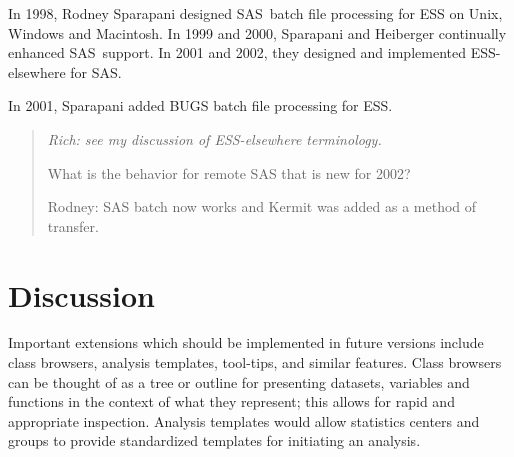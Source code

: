 \documentclass{article}
\newcommand*{\SAS}{\textsc{SAS}}
\newenvironment{Comment}{\begin{quote}\small\itshape }{\end{quote}}
\begin{document}
In 1998, Rodney Sparapani designed \SAS\ batch file processing for ESS
on Unix, Windows and Macintosh.  In 1999 and 2000, Sparapani and Heiberger
continually enhanced \SAS\ support. 
In 2001 and 2002, they designed and implemented ESS-elsewhere for \SAS.  

In 2001, Sparapani added BUGS batch file processing for ESS.

\begin{Comment}
Rich: see my discussion of ESS-elsewhere terminology.

What is the behavior for remote SAS that is new for 2002?

Rodney: SAS batch now works and Kermit was added as a method of transfer.
\end{Comment}


\section{Discussion}
\label{sec:discussion}


Important extensions which should be implemented in future
versions include class browsers, analysis templates, tool-tips, and
similar features.  Class browsers can be thought of as a tree or
outline for presenting datasets, variables and functions in the
context of what they represent; this allows for rapid and appropriate
inspection.  Analysis templates would allow statistics centers and
groups to provide standardized templates for initiating an analysis.
\end{document}
